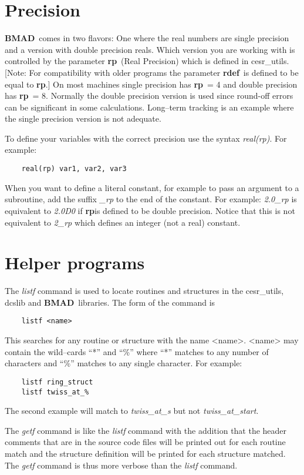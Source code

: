 \documentclass{book}
\newcommand{\bmad}{{\bf BMAD}}
\newcommand{\rp}{{\bf rp}}
\newcommand{\rdef}{{\bf rdef}}
\begin{document}
\section{Precision}

\bmad\ comes in two flavors: One where the real numbers are single
precision and a version with double precision reals. Which version you
are working with is controlled by the parameter \rp\ (Real Precision)
which is defined in cesr\_utils. [Note: For compatibility with older
programs the parameter \rdef\ is defined to be equal to \rp.]  On most
machines single precision has \rp\ = 4 and double precision has \rp\ =
8. Normally the double precision version is used since round-off
errors can be significant in some calculations. Long--term tracking is
an example where the single precision version is not adequate. 

To define your variables with the correct precision use the syntax
{\it real(rp)}. For example:
\begin{verbatim}
    real(rp) var1, var2, var3
\end{verbatim}
When you want to define a literal constant, for example to pass an
argument to a subroutine, add the suffix {\it \_rp} to the end of the
constant. For example: {\it 2.0\_rp} is equivalent to {\it 2.0D0} if
\rp is defined to be double precision. Notice that this is not
equivalent to {\it 2\_rp} which defines an integer (not a real) constant.


\section{Helper programs}

The {\it listf} command is used to locate routines and structures in
the cesr\_utils, dcslib and \bmad\ libraries. The form of the command is
\begin{verbatim}
    listf <name>
\end{verbatim}
This searches for any routine or structure with the name
<name>. <name> may contain the wild--cards ``*'' and ``\%'' where
``*'' matches to any number of characters and ``\%'' matches to any
single character. For example:
\begin{verbatim}
    listf ring_struct
    listf twiss_at_%
\end{verbatim}
The second example will match to {\it twiss\_at\_s} but not {\sl
twiss\_at\_start}.

The {\it getf} command is like the {\it listf} command with the
addition that the header comments that are in the source code files
will be printed out for each routine match and the structure definition
will be printed for each structure matched. The {\it getf} command is
thus more verbose than the {\it listf} command.
\end{document}
